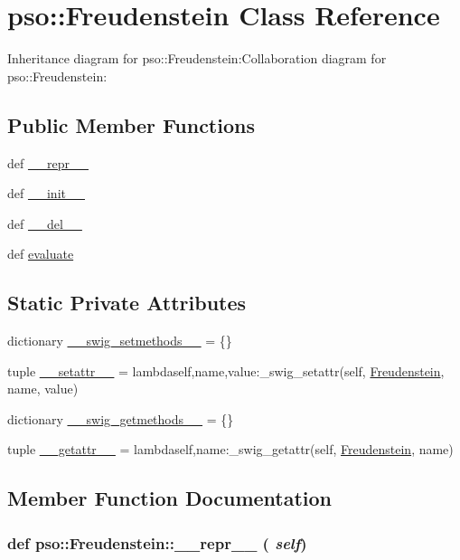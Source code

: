 \hypertarget{classpso_1_1Freudenstein}{
\section{pso::Freudenstein Class Reference}
\label{classpso_1_1Freudenstein}
}
Inheritance diagram for pso::Freudenstein:Collaboration diagram for pso::Freudenstein:\subsection*{Public Member Functions}
\begin{CompactItemize}
\item 
def \hyperlink{classpso_1_1Freudenstein_593b2ae91d886ecccd01877ac2321ae4}{\_\-\_\-repr\_\-\_\-}
\item 
def \hyperlink{classpso_1_1Freudenstein_5bede09ddc059943e97451908bf5b622}{\_\-\_\-init\_\-\_\-}
\item 
def \hyperlink{classpso_1_1Freudenstein_bcb8a7755b12ba21aa67353f25b4b243}{\_\-\_\-del\_\-\_\-}
\item 
def \hyperlink{classpso_1_1Freudenstein_bfe2aea7372da1083a9f562ec6c4ed82}{evaluate}
\end{CompactItemize}
\subsection*{Static Private Attributes}
\begin{CompactItemize}
\item 
dictionary \hyperlink{classpso_1_1Freudenstein_d9e773221878926aafbb38d695a4017e}{\_\-\_\-swig\_\-setmethods\_\-\_\-} = \{\}
\item 
tuple \hyperlink{classpso_1_1Freudenstein_13d26a6411b620f14698a539a7321080}{\_\-\_\-setattr\_\-\_\-} = lambdaself,name,value:\_\-swig\_\-setattr(self, \hyperlink{classpso_1_1Freudenstein}{Freudenstein}, name, value)
\item 
dictionary \hyperlink{classpso_1_1Freudenstein_5e01e784238005f1fe1d4befa249be0f}{\_\-\_\-swig\_\-getmethods\_\-\_\-} = \{\}
\item 
tuple \hyperlink{classpso_1_1Freudenstein_6ceb435fb356ceecdc0358b41551b3ce}{\_\-\_\-getattr\_\-\_\-} = lambdaself,name:\_\-swig\_\-getattr(self, \hyperlink{classpso_1_1Freudenstein}{Freudenstein}, name)
\end{CompactItemize}


\subsection{Member Function Documentation}
\hypertarget{classpso_1_1Freudenstein_593b2ae91d886ecccd01877ac2321ae4}{
\subsubsection{\setlength{\rightskip}{0pt plus 5cm}def pso::Freudenstein::\_\-\_\-repr\_\-\_\- ( {\em self})}}
\label{classpso_1_1Freudenstein_593b2ae91d886ecccd01877ac2321ae4}




